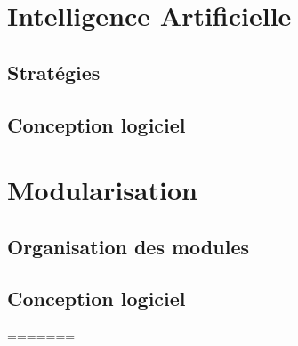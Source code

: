 \documentclass[a4paper,12pt]{article}
\begin{document}


\section{Intelligence Artificielle}

\subsection{Stratégies}

\clearpage
\subsection{Conception logiciel}




\section{Modularisation}
\label{sec:module}

\subsection{Organisation des modules}

\clearpage
\subsection{Conception logiciel}


%
=======
    \thispagestyle{empty}
\end{document}
